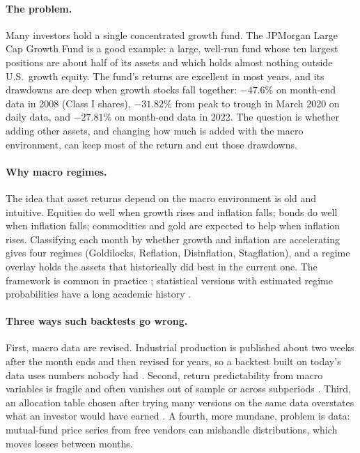 \documentclass[11pt,a4paper]{article}
\begin{document}
\paragraph{The problem.} Many investors hold a single concentrated growth fund. The JPMorgan Large Cap Growth
Fund is a good example: a large, well-run fund whose ten largest positions are about half of its assets and
which holds almost nothing outside U.S.\ growth equity. The fund's returns are excellent in most years, and its
drawdowns are deep when growth stocks fall together: $-47.6\%$ on month-end data in 2008 (Class I shares),
$-31.82\%$ from peak to trough in March 2020 on daily data, and $-27.81\%$ on month-end data in 2022. The
question is whether adding other assets, and changing how much is added with the macro environment, can keep
most of the return and cut those drawdowns.

\paragraph{Why macro regimes.} The idea that asset returns depend on the macro environment is old and
intuitive. Equities do well when growth rises and inflation falls; bonds do well when inflation falls;
commodities and gold are expected to help when inflation rises. Classifying each month by whether growth and
inflation are accelerating gives four regimes (Goldilocks, Reflation, Disinflation, Stagflation), and a
regime overlay holds the assets that historically did best in the current one. The framework is common in
practice \citep{ilmanen2011}; statistical versions with estimated regime probabilities have a long academic
history \citep{ang2002}.

\paragraph{Three ways such backtests go wrong.} First, macro data are revised. Industrial production is
published about two weeks after the month ends and then revised for years, so a backtest built on today's
data uses numbers nobody had \citep{croushore2001,orphanides2001}. Second, return predictability from macro
variables is fragile and often vanishes out of sample or across subperiods \citep{welch2008}. Third, an
allocation table chosen after trying many versions on the same data overstates what an investor would have
earned \citep{harvey2016,bailey2014}. A fourth, more mundane, problem is data: mutual-fund price series from
free vendors can mishandle distributions, which moves losses between months.
\end{document}
